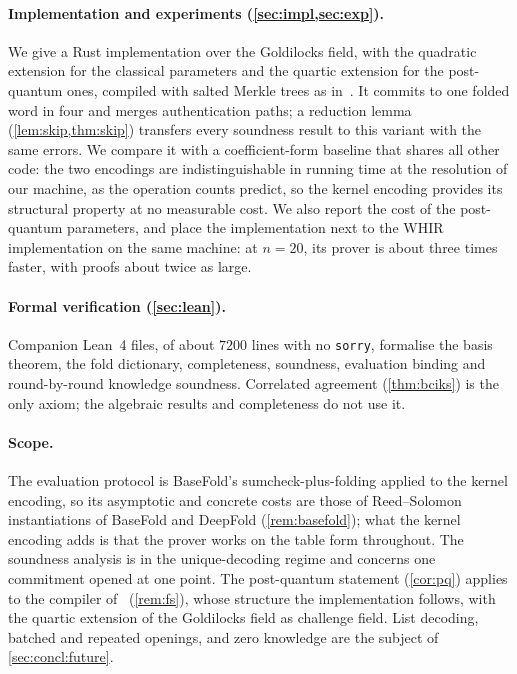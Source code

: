 \paragraph{Implementation and experiments (\cref{sec:impl,sec:exp}).}
We give a Rust implementation over the Goldilocks field, with the quadratic extension for the classical parameters and the quartic extension for the post-quantum ones, compiled with salted Merkle trees as in~\cite{CDHZ25}.
It commits to one folded word in four and merges authentication paths; a reduction lemma (\cref{lem:skip,thm:skip}) transfers every soundness result to this variant with the same errors.
We compare it with a coefficient-form baseline that shares all other code: the two encodings are indistinguishable in running time at the resolution of our machine, as the operation counts predict, so the kernel encoding provides its structural property at no measurable cost.
We also report the cost of the post-quantum parameters, and place the implementation next to the WHIR implementation on the same machine: at $n = 20$, its prover is about three times faster, with proofs about twice as large.

\paragraph{Formal verification (\cref{sec:lean}).}
Companion Lean~4 files, of about $7200$ lines with no \texttt{sorry}, formalise the basis theorem, the fold dictionary, completeness, soundness, evaluation binding and round-by-round knowledge soundness. Correlated agreement (\cref{thm:bciks}) is the only axiom; the algebraic results and completeness do not use it.

\paragraph{Scope.}
The evaluation protocol is BaseFold's sumcheck-plus-folding applied to the kernel encoding, so its asymptotic and concrete costs are those of Reed--Solomon instantiations of BaseFold and DeepFold (\cref{rem:basefold}); what the kernel encoding adds is that the prover works on the table form throughout.
The soundness analysis is in the unique-decoding regime and concerns one commitment opened at one point.
The post-quantum statement (\cref{cor:pq}) applies to the compiler of~\cite{CDHZ25} (\cref{rem:fs}), whose structure the implementation follows, with the quartic extension of the Goldilocks field as challenge field.
List decoding, batched and repeated openings, and zero knowledge are the subject of \cref{sec:concl:future}.

